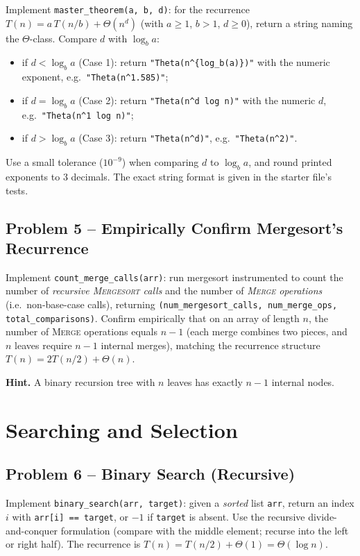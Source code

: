 \documentclass[11pt]{article}
\begin{document}
Implement \texttt{master\_theorem(a, b, d)}: for the recurrence $T(n) = a\,T(n/b) +
\Theta(n^d)$ (with $a \ge 1$, $b > 1$, $d \ge 0$), return a string naming the
$\Theta$-class. Compare $d$ with $\log_b a$:
\begin{itemize}
    \item if $d < \log_b a$ (Case 1): return \texttt{"Theta(n\^{}\{log\_b(a)\})"} with the
    numeric exponent, e.g.\ \texttt{"Theta(n\^{}1.585)"};
    \item if $d = \log_b a$ (Case 2): return \texttt{"Theta(n\^{}d log n)"} with the numeric
    $d$, e.g.\ \texttt{"Theta(n\^{}1 log n)"};
    \item if $d > \log_b a$ (Case 3): return \texttt{"Theta(n\^{}d)"}, e.g.\
    \texttt{"Theta(n\^{}2)"}.
\end{itemize}
Use a small tolerance ($10^{-9}$) when comparing $d$ to $\log_b a$, and round printed
exponents to 3 decimals. The exact string format is given in the starter file's tests.

\subsection*{Problem 5 -- Empirically Confirm Mergesort's Recurrence}

Implement \texttt{count\_merge\_calls(arr)}: run mergesort instrumented to count the number
of \emph{recursive \textsc{Mergesort} calls} and the number of \emph{\textsc{Merge}
operations} (i.e.\ non-base-case calls), returning \texttt{(num\_mergesort\_calls,
num\_merge\_ops, total\_comparisons)}. Confirm empirically that on an array of length $n$,
the number of \textsc{Merge} operations equals $n - 1$ (each merge combines two pieces, and
$n$ leaves require $n-1$ internal merges), matching the recurrence structure
$T(n) = 2T(n/2) + \Theta(n)$.

\textbf{Hint.} A binary recursion tree with $n$ leaves has exactly $n - 1$ internal nodes.

\newpage
\section{Searching and Selection}

\subsection*{Problem 6 -- Binary Search (Recursive)}

Implement \texttt{binary\_search(arr, target)}: given a \emph{sorted} list \texttt{arr},
return an index $i$ with \texttt{arr[i] == target}, or $-1$ if \texttt{target} is absent.
Use the recursive divide-and-conquer formulation (compare with the middle element; recurse
into the left or right half). The recurrence is $T(n) = T(n/2) + \Theta(1) = \Theta(\log
n)$.
\end{document}
